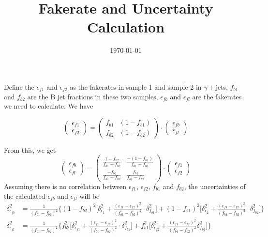 \documentclass{article}
\title{Fakerate and Uncertainty Calculation}
\author{}
\date{\today{}}
\begin{document}
\maketitle

\begin{flushleft}

Define the $\epsilon_{f1}$ and $\epsilon_{f2}$ as the fakerates in sample 1 and sample 2 in $\gamma+$jets, $f_{b1}$ and $f_{b2}$ are the B jet fractions in these two samples, $\epsilon_{fb}$ and $\epsilon_{fl}$ are the fakerates we need to calculate. We have

\begin{equation}
\begin{pmatrix} \epsilon_{f1} \\ \epsilon_{f2} \end{pmatrix}=\begin{pmatrix} f_{b1} & (1-f_{b1}) \\ f_{b2} & (1-f_{b2}) \end{pmatrix}\cdot \begin{pmatrix}\epsilon_{fb} \\ \epsilon_{fl} \end{pmatrix} 
\end{equation}

From this, we get
\begin{equation}
\begin{pmatrix} \epsilon_{fb} \\ \epsilon_{fl} \end{pmatrix} = \begin{pmatrix} \frac{1-f_{b2}}{f_{b1}-f_{b2}} & \frac{-(1-f_{b1})}{f_{b1}-f_{b2}} \\ \frac{-f_{b2}}{f_{b1}-f_{b2}} & \frac{f_{b1}}{f_{b1}-f_{b2}}\end{pmatrix}\cdot \begin{pmatrix} \epsilon_{f1} \\ \epsilon_{f2} \end{pmatrix}
\end{equation}
Assuming there is no correlation between $\epsilon_{f1}$, $\epsilon_{f2}$, $f_{b1}$ and $f_{b2}$, the uncertainties of the calculated $\epsilon_{fb}$ and $\epsilon_{fl}$ will be
\begin{align}
\delta^2_{\epsilon_{fb}}&=\frac{1}{(f_{b1}-f_{b2})^2}\Bigg\{(1-f_{b2})^2\bigg[\delta^2_{\epsilon_1}+\frac{(\epsilon_{f1}-\epsilon_{f2})^2}{(f_{b1}-f_{b2})^2}\cdot\delta^2_{f_{b1}}\bigg]+(1-f_{b1})^2\bigg[\delta^2_{\epsilon_2}+\frac{(\epsilon_{f1}-\epsilon_{f2})^2}{(f_{b1}-f_{b2})^2}\cdot\delta^2_{f_{b2}}\bigg]\Bigg\}\\
\delta^2_{\epsilon_{fl}}&=\frac{1}{(f_{b1}-f_{b2})^2}\Bigg\{f^2_{b2}\bigg[\delta^2_{\epsilon_{f1}}+\frac{(\epsilon_{f1}-\epsilon_{f2})^2}{(f_{b1}-f_{b2})^2}\cdot\delta^2_{f_{b1}}\bigg]+f^2_{b1}\bigg[\delta^2_{\epsilon_{f2}}+\frac{(\epsilon_{f1}-\epsilon_{f2})^2}{(f_{b1}-f_{b2})^2}\delta^2_{f_{b2}}\bigg]\Bigg\}
\end{align}


\end{flushleft}
\end{document}
